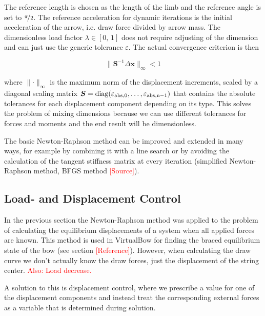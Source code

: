 The reference length is chosen as the length of the limb and the reference angle is set to $\nicefrac{\pi}{2}$.
The reference acceleration for dynamic iterations is the initial acceleration of the arrow, i.e. draw force divided by arrow mass.
The dimensionless load factor $\lambda \in [0,\,1]$ does not require adjusting of the dimension and can just use the generic tolerance $\varepsilon$.
The actual convergence criterion is then

\begin{equation}
\lVert \boldsymbol{S}^{-1}\Delta\boldsymbol{x} \rVert_{\infty} < 1
\end{equation}

where $\lVert\cdot\rVert_{\infty}$ is the maximum norm of the displacement increments, scaled by a diagonal scaling matrix $\boldsymbol{S} = \rm{diag}(\varepsilon_{\rm{abs},0},\ldots,\varepsilon_{\rm{abs},n-1})$ that contains the absolute tolerances for each displacement component depending on its type.
This solves the problem of mixing dimensions because we can use different tolerances for forces and moments and the end result will be dimensionless.

The basic Newton-Raphson method can be improved and extended in many ways, for example by combining it with a line search or by avoiding the calculation of the tangent stiffness matrix at every iteration (simplified Newton-Raphson method, BFGS method \textcolor{red}{[Source]}).

\subsection{Load- and Displacement Control}
\label{sec:constrained-newton-raphson}

In the previous section the Newton-Raphson method was applied to the problem of calculating the equilibrium displacements of a system when all applied forces are known. This method is used in VirtualBow for finding the braced equilibrium state of the bow (see section \textcolor{red}{[Reference]}). However, when calculating the draw curve we don't actually know the draw forces, just the displacement of the string center. \textcolor{red}{Also: Load decrease.}

A solution to this is displacement control, where we prescribe a value for one of the displacement components and instead treat the corresponding external forces as a variable that is determined during solution.

